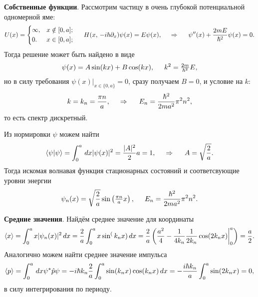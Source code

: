 
\textbf{Собственные функции}. 
Рассмотрим частицу в очень глубокой потенциальной одномерной яме:
\begin{equation*}
    U(x) = \left\{\begin{aligned}
        &\infty,  &x \notin [0, a]; \\
        &0. &x \in [0, a];
    \end{aligned}\right.
    \hspace{5 mm} 
    H(x,\, -  i \hbar \partial_x) \psi(x) = E \psi(x),
    \hspace{0.5cm} \Rightarrow \hspace{0.5cm}
    \psi''(x) + \frac{2m E}{\hbar^2} \psi(x)  = 0.
\end{equation*}
Тогда решение может быть найдено в виде
\begin{equation*}
    \psi(x) = A \sin (kx) + B \cos(kx), \hspace{5 mm} 
    k^2 = \tfrac{2m}{\hbar^2}E,
\end{equation*}
но в силу требования $\psi(x)|_{x \in \{0, a\}} = 0$, сразу получаем $B =0 $, и условие на $k$:
\begin{equation*}
    k = k_n = \frac{\pi n}{a},
    \hspace{0.5cm} \Rightarrow \hspace{0.5cm}
    E_n = \frac{\hbar^2}{2m a^2} \pi^2 n^2,
\end{equation*}
то есть спектр дискретный. 

Из нормировки $\psi$ можем найти
\begin{equation*}
    \bk{\psi}{\psi} = \int_0^a \d x |\psi(x)|^2 = \frac{|A|^2}{2} a = 1,
    \hspace{0.5cm} \Rightarrow \hspace{0.5cm}
    A = \sqrt{\frac{2}{a}}.
\end{equation*}
Тогда искомая волнавая функция стационарных состояний и соответсвующие уровни энергии
\begin{equation*}
    \psi_n (x) = \sqrt{\frac{2}{a}} \sin \left(\tfrac{\pi n}{a} x\right) ,
    \hspace{5 mm} 
    E_n = \frac{\hbar^2}{2m a^2} \pi^2 n^2.
\end{equation*}



\textbf{Средние значения}. Найдём среднее значение для координаты
\begin{equation*}
    \langle x\rangle = \int_0^a x |\psi_n (x)|^2 \, d x = 
    \frac{2}{a} \int_0^a x \sin^ (k_n x) \, d x = \frac{2}{a}\left(
        \frac{a^2}{4} - \frac{1}{4 k_n } \frac{1}{2 k_n} \cos(2 k_n x) \bigg|_0^a
    \right) = \frac{a}{2}.
\end{equation*}
Аналогично можем найти среднее значение импульса
\begin{equation*}
    \langle p\rangle = \int_0^a \, d x \psi^* \hat{p} \psi = 
    - i \hbar k_n \frac{2}{a} \int_0^a \sin(k_n x) \cos(k_n x) \, d x = - \frac{i \hbar k_n}{a} \int_0^a \sin(2 k_n x) = 0,
\end{equation*}
в силу интегрирования по периоду. 

